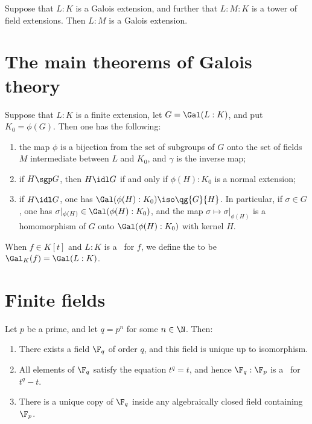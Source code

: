 \documentclass{article}
\begin{document}
  \begin{tproposition}
    Suppose that $L:K$ is a Galois extension, and further that $L:M:K$ is a tower of field extensions. Then $L:M$ is a Galois extension.
  \end{tproposition}

\section{The main theorems of Galois theory}
  \begin{ttheorem}
    Suppose that $L:K$ is a finite extension, let $G=\Gal(L:K)$, and put $K_0=\phi(G)$. Then one has the following:
    \begin{enumerate}[label=(\alph*)]
      \item the map $\phi$ is a bijection from the set of subgroups of $G$ onto the set of fields $M$ intermediate between $L$ and $K_0$, and $\gamma$ is the inverse map;
      \item if $H\sgp G$, then $H\idl G$ if and only if $\phi(H):K_0$ is a normal extension;
      \item if $H\idl G$, one has $\Gal(\phi(H):K_0)\iso \qg{G}{H}$. In particular, if $\sigma\in G$, one has $\sigma|_{\phi(H)}\in \Gal(\phi(H):K_0)$, and the map $\sigma\mapsto\sigma|_{\phi(H)}$ is a homomorphism of $G$ onto $\Gal(\phi(H):K_0)$ with kernel $H$.
    \end{enumerate}
  \end{ttheorem}

  \begin{tdefinition}
    When $f\in K[t]$ and $L:K$ is a \sfe~for $f$, we define the  to be $ \Gal_K(f) = \Gal(L:K)$.
  \end{tdefinition}

\section{Finite fields}
  \begin{ttheorem}
    Let $p$ be a prime, and let $q=p^n$ for some $n\in \N$. Then:
    \begin{enumerate}[label=(\alph*)]
      \item There exists a field $\F_q$ of order $q$, and this field is unique up to isomorphism.
      \item All elements of $\F_q$ satisfy the equation $t^q=t$, and hence $\F_q:\F_p$ is a \sfe~for $t^q-t$.
      \item There is a unique copy of $\F_q$ inside any algebraically closed field containing $\F_p$.
    \end{enumerate}
  \end{ttheorem}
\end{document}
